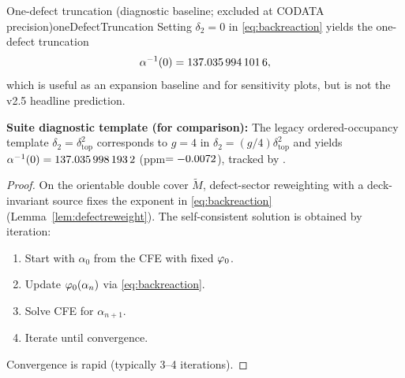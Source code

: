\begin{lemma}{One-defect truncation (diagnostic baseline; excluded at CODATA precision)}{oneDefectTruncation}
Setting $\delta_2=0$ in \eqref{eq:backreaction} yields the one-defect truncation
\[
\alpha^{-1}(0)=\num[round-mode=places,round-precision=10]{\TFPTalphaInvSelfNum},
\]
which is useful as an expansion baseline and for sensitivity plots, but is not the v2.5 headline prediction.
\end{lemma}

\begin{remark}
\textbf{Suite diagnostic template (for comparison):} The legacy ordered-occupancy template $\delta_2=\delta_{\mathrm{top}}^2$ corresponds to $g=4$ in $\delta_2=(g/4)\delta_{\mathrm{top}}^2$ and yields
$\alpha^{-1}(0)=\num[round-mode=places,round-precision=10]{\TFPTalphaInvTwoDefNum}$ (ppm$=\num[round-mode=places,round-precision=4]{\TFPTalphaPpmTwoDefNum}$), tracked by .
\end{remark}

\begin{proof}
On the orientable double cover $\widetilde{M}$, defect-sector reweighting with a
deck-invariant source fixes the exponent in \eqref{eq:backreaction}
(Lemma~\ref{lem:defectreweight}). The self-consistent solution is obtained by iteration:
\begin{enumerate}
    \item Start with $\alpha_0$ from the CFE with fixed $\varphi_0$.
    \item Update $\varphi_0(\alpha_n)$ via \eqref{eq:backreaction}.
    \item Solve CFE for $\alpha_{n+1}$.
    \item Iterate until convergence.
\end{enumerate}
Convergence is rapid (typically 3--4 iterations).
\end{proof}

